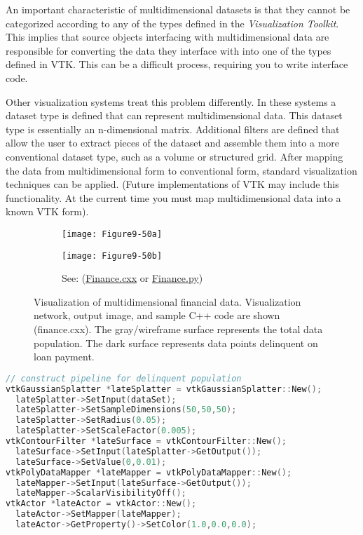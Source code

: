 An important characteristic of multidimensional datasets is that they cannot be categorized according to any of the types defined in the \emph{Visualization Toolkit}. This implies that source objects interfacing with multidimensional data are responsible for converting the data they interface with into one of the types defined in VTK. This can be a difficult process, requiring you to write interface code.

Other visualization systems treat this problem differently. In these systems a dataset type is defined that can represent multidimensional data. This dataset type is essentially an n-dimensional matrix. Additional filters are defined that allow the user to extract pieces of the dataset and assemble them into a more conventional dataset type, such as a volume or structured grid. After mapping the data from multidimensional form to conventional form, standard visualization techniques can be applied. (Future implementations of VTK may include this functionality. At the current time you must map multidimensional data into a known VTK form).

\begin{figure}[htb]
    \centering
	\begin{subfigure}[h]{0.48\linewidth}
		\texttt{[image: Figure9-50a]}
		\captionsetup{justification=centering}
		\caption*{}
		\label{fig:Figure9-50a}
	\end{subfigure}
	\hfill
	\begin{subfigure}[h]{0.48\linewidth}
		\texttt{[image: Figure9-50b]}
		\captionsetup{justification=centering}
		\caption*{See: (\href{https://lorensen.github.io/VTKExamples/site/Cxx/Modelling/Finance/}{Finance.cxx} or \href{https://lorensen.github.io/VTKExamples/site/Python/Modelling/Finance/}{Finance.py})}
	\end{subfigure}
	\caption{Visualization of multidimensional financial data. Visualization network, output image, and sample C++ code are shown (finance.cxx). The gray/wireframe surface represents the total data population. The dark surface represents data points delinquent on loan payment.}\label{fig:Figure9-50}
\end{figure}

\begin{lstlisting}[language=C++, caption={Visualizing multidimensional data.}]
// construct pipeline for delinquent population
vtkGaussianSplatter *lateSplatter = vtkGaussianSplatter::New();
  lateSplatter->SetInput(dataSet);
  lateSplatter->SetSampleDimensions(50,50,50);
  lateSplatter->SetRadius(0.05);
  lateSplatter->SetScaleFactor(0.005);
vtkContourFilter *lateSurface = vtkContourFilter::New();
  lateSurface->SetInput(lateSplatter->GetOutput());
  lateSurface->SetValue(0,0.01);
vtkPolyDataMapper *lateMapper = vtkPolyDataMapper::New();
  lateMapper->SetInput(lateSurface->GetOutput());
  lateMapper->ScalarVisibilityOff();
vtkActor *lateActor = vtkActor::New();
  lateActor->SetMapper(lateMapper);
  lateActor->GetProperty()->SetColor(1.0,0.0,0.0);
\end{lstlisting}

